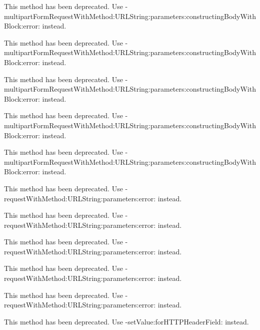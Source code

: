 
\begin{DoxyRefList}
\item[\label{deprecated__deprecated000003}%
\Hypertarget{deprecated__deprecated000003}%
Member \mbox{\hyperlink{interface_a_f_h_t_t_p_request_serializer_a7fc28e3419037c411489c3aa16c754a0}{\mbox{[}A\+F\+H\+T\+T\+P\+Request\+Serializer multipart\+Form\+Request\+With\+Method\+:U\+R\+L\+String\+:parameters\+:constructing\+Body\+With\+Block\+:\mbox{]}}} ]This method has been deprecated. Use -\/multipart\+Form\+Request\+With\+Method\+:U\+R\+L\+String\+:parameters\+:constructing\+Body\+With\+Block\+:error\+: instead. 

This method has been deprecated. Use -\/multipart\+Form\+Request\+With\+Method\+:U\+R\+L\+String\+:parameters\+:constructing\+Body\+With\+Block\+:error\+: instead. 

This method has been deprecated. Use -\/multipart\+Form\+Request\+With\+Method\+:U\+R\+L\+String\+:parameters\+:constructing\+Body\+With\+Block\+:error\+: instead. 

This method has been deprecated. Use -\/multipart\+Form\+Request\+With\+Method\+:U\+R\+L\+String\+:parameters\+:constructing\+Body\+With\+Block\+:error\+: instead. 

This method has been deprecated. Use -\/multipart\+Form\+Request\+With\+Method\+:U\+R\+L\+String\+:parameters\+:constructing\+Body\+With\+Block\+:error\+: instead.  
\item[\label{deprecated__deprecated000002}%
\Hypertarget{deprecated__deprecated000002}%
Member \mbox{\hyperlink{interface_a_f_h_t_t_p_request_serializer_a929788bfc0a6bfda0a686a019dae1803}{\mbox{[}A\+F\+H\+T\+T\+P\+Request\+Serializer request\+With\+Method\+:U\+R\+L\+String\+:parameters\+:\mbox{]}}} ]This method has been deprecated. Use -\/request\+With\+Method\+:U\+R\+L\+String\+:parameters\+:error\+: instead. 

This method has been deprecated. Use -\/request\+With\+Method\+:U\+R\+L\+String\+:parameters\+:error\+: instead. 

This method has been deprecated. Use -\/request\+With\+Method\+:U\+R\+L\+String\+:parameters\+:error\+: instead. 

This method has been deprecated. Use -\/request\+With\+Method\+:U\+R\+L\+String\+:parameters\+:error\+: instead. 

This method has been deprecated. Use -\/request\+With\+Method\+:U\+R\+L\+String\+:parameters\+:error\+: instead.  
\item[\label{deprecated__deprecated000001}%
\Hypertarget{deprecated__deprecated000001}%
Member \mbox{\hyperlink{interface_a_f_h_t_t_p_request_serializer_aa7426bb8422c203a0aeb17f8c04ff8e6}{\mbox{[}A\+F\+H\+T\+T\+P\+Request\+Serializer set\+Authorization\+Header\+Field\+With\+Token\+:\mbox{]}}} ]This method has been deprecated. Use -\/set\+Value\+:for\+H\+T\+T\+P\+Header\+Field\+: instead. 


\end{DoxyRefList}
